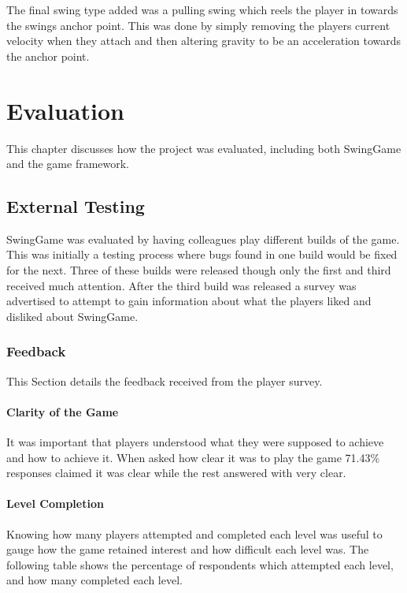 \documentclass[]{report}
\begin{document}
			The final swing type added was a pulling swing which reels the player in towards the swings anchor point. This was done by simply removing the players current velocity when they attach and then altering gravity to be an acceleration towards the anchor point.
		

\chapter{Evaluation}
This chapter discusses how the project was evaluated, including both SwingGame and the game framework.
	\section{External Testing}
	SwingGame was evaluated by having colleagues play different builds of the game. This was initially a testing process where bugs found in one build would be fixed for the next. Three of these builds were released though only the first and third received much attention. After the third build was released a survey was advertised to attempt to gain information about what the players liked and disliked about SwingGame.
		\subsection{Feedback}
		This Section details the feedback received from the player survey.
			\subsubsection{Clarity of the Game}
			It was important that players understood what they were supposed to achieve and how to achieve it. When asked how clear it was to play the game 71.43\% responses claimed it was clear while the rest answered with very clear.
			\subsubsection{Level Completion}
			Knowing how many players attempted and completed each level was useful to gauge how the game retained interest and how difficult each level was. The following table shows the percentage of respondents which attempted each level, and how many completed each level.
			
\end{document}
